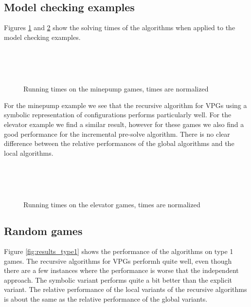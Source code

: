 \subsection{Model checking examples}
Figures \ref{fig:results_minepump} and \ref{fig:results_elevator} show the solving times of the algorithms when applied to the model checking examples.
\begin{figure}[H]
	\centering
	\begin{multicols}{2}
		\\\vfill
		\\
		\\\vfill
		
	\end{multicols}
	\caption{Running times on the minepump games, times are normalized}
	\label{fig:results_minepump}
\end{figure}%
For the minepump example we see that the recursive algorithm for VPGs using a symbolic representation of configurations performs particularly well. For the elevator example we find a similar result, however for these games we also find a good performance for the incremental pre-solve algorithm. There is no clear difference between the relative performances of the global algorithms and the local algorithms.
\begin{figure}[H]
	\centering
	\begin{multicols}{2}
		\\\vfill
		\\
		\\\vfill
		
	\end{multicols}
	\caption{Running times on the elevator games, times are normalized}
	\label{fig:results_elevator}
\end{figure}%

\subsection{Random games}
Figure \ref{fig:results_type1} shows the performance of the algorithms on type 1 games. The recursive algorithms for VPGs performh quite well, even though there are a few instances where the performance is worse that the independent approach. The symbolic variant performs quite a bit better than the explicit variant. The relative performance of the local variants of the recursive algorithms is about the same as the relative performance of the global variants. 

